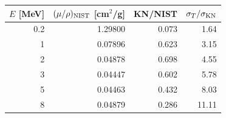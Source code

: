 \begin{tabular}{rrrr}\toprule $E$ [MeV] & $(\mu/\rho)_{\rm NIST}$ [cm$^2$/g] & KN/NIST & $\sigma_T/\sigma_{\rm KN}$\\\midrule
0.2 & 1.29800 & 0.073 & 1.64\\
1 & 0.07896 & 0.623 & 3.15\\
2 & 0.04878 & 0.698 & 4.55\\
3 & 0.04447 & 0.602 & 5.78\\
5 & 0.04463 & 0.432 & 8.03\\
8 & 0.04879 & 0.286 & 11.11\\
\bottomrule\end{tabular}
